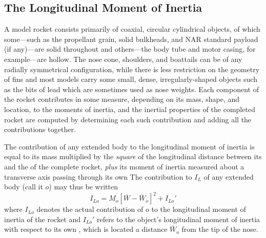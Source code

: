 \subsection{The Longitudinal Moment of Inertia}\label{ch2:sec:4.5}

A model rocket consists primarily of coaxial, circular cylindrical objects,
of which some---such as the propellant grain, solid bulkheads, and NAR
standard payload (if any)---are solid throughout and others---the body tube
and motor casing, for example---are hollow. The nose cone, shoulders, and
boattails can be of any radially symmetrical configuration, while there is
less restriction on the geometry of fins and most models carry some small,
dense, irregularly-shaped objects such as the bits of lead which are
sometimes used as nose weights. Each component of the rocket contributes in
some measure, depending on its mass, shape, and location, to the moments of
inertia, and the inertial properties of the completed rocket are computed by
determining each such contribution and adding all the contributions
together.

The contribution of any extended body to the longitudinal moment of inertia
is equal to its mass multiplied by the \emph{square} of the longitudinal
distance between its \CG{} and the \CG{} of the complete rocket, \emph{plus}
its moment of inertia measured about a transverse axis passing through its
own \CG{} The contribution to $I_L$ of any extended body (call it $o$) may
thus be written
\begin{equation}\label{ch2:eq:102}
I_{Lo} = M_o\left[\bar{W} - \bar{W}_o\right]^{2} + I_{Lo}'
\end{equation}
where $I_{Lo}$ denotes the actual contribution of $o$ to the longitudinal
moment of inertia of the rocket and $I_{Lo}'$ refers to the object's
longitudinal moment of inertia with respect to its own \CG, which is located
a distance $\bar{W}_o$ from the tip of the nose.

